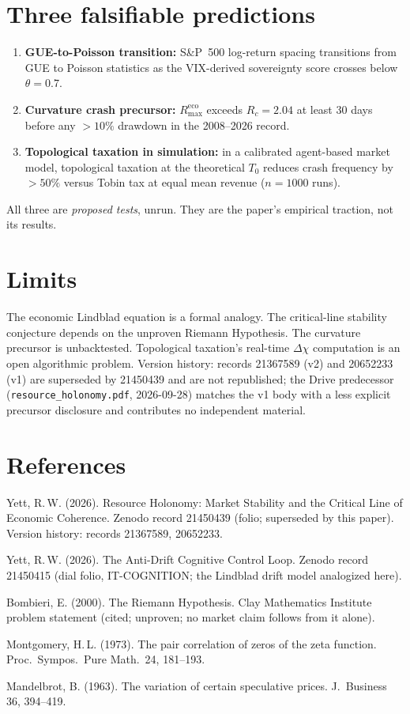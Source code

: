 \documentclass{alienfolio}
\begin{document}
\section{Three falsifiable predictions}
\begin{enumerate}
\item \textbf{GUE-to-Poisson transition:} S\&P~500 log-return spacing
transitions from GUE to Poisson statistics as the VIX-derived sovereignty
score crosses below $\theta = 0.7$.
\item \textbf{Curvature crash precursor:} $R^{\mathrm{eco}}_{\max}$ exceeds
$R_c = 2.04$ at least 30 days before any $> 10\%$ drawdown in the 2008--2026
record.
\item \textbf{Topological taxation in simulation:} in a calibrated
agent-based market model, topological taxation at the theoretical $T_0$
reduces crash frequency by $> 50\%$ versus Tobin tax at equal mean revenue
($n = 1000$ runs).
\end{enumerate}
 All three are \emph{proposed tests}, unrun. They are
the paper's empirical traction, not its results.

\section{Limits}
The economic Lindblad equation is a formal analogy. The critical-line
stability conjecture depends on the unproven Riemann Hypothesis. The
curvature precursor is unbacktested. Topological taxation's real-time
$\Delta\chi$ computation is an open algorithmic problem. Version history:
records 21367589 (v2) and 20652233 (v1) are superseded by 21450439 and are
not republished; the Drive predecessor (\texttt{resource\_holonomy.pdf},
2026-09-28) matches the v1 body with a less explicit precursor disclosure
and contributes no independent material.

\section*{References}
Yett, R.\,W. (2026). Resource Holonomy: Market Stability and the Critical
Line of Economic Coherence. Zenodo record 21450439 (folio; superseded by
this paper). Version history: records 21367589, 20652233.

Yett, R.\,W. (2026). The Anti-Drift Cognitive Control Loop. Zenodo record
21450415 (dial folio, IT-COGNITION; the Lindblad drift model analogized
here).

Bombieri, E. (2000). The Riemann Hypothesis. Clay Mathematics Institute
problem statement (cited; unproven; no market claim follows from it alone).

Montgomery, H.\,L. (1973). The pair correlation of zeros of the zeta
function. Proc.\ Sympos.\ Pure Math.\ 24, 181--193.

Mandelbrot, B. (1963). The variation of certain speculative prices.
J.\ Business 36, 394--419.
\end{document}
